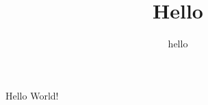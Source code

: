 \documentclass{article}
\title{Hello}
\author{hello}
\begin{document}
  \maketitle
  \newpage

  Hello World!
  \newpage
  
\end{document}
